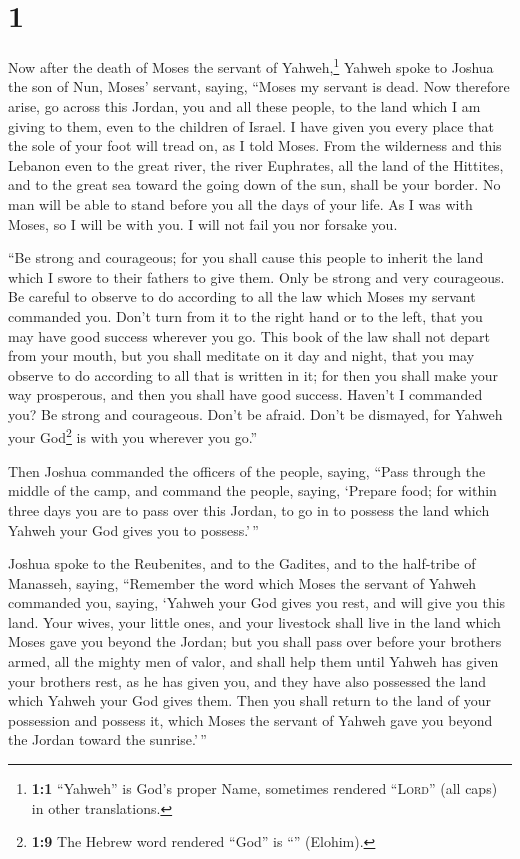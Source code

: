 \hypertarget{section}{%
\section{1}\label{section}}

 Now after the death of Moses the servant of
Yahweh,\footnote{\textbf{1:1} ``Yahweh'' is God's proper Name, sometimes
  rendered ``\textsc{Lord}'' (all caps) in other translations.} Yahweh
spoke to Joshua the son of Nun, Moses' servant, saying, 
``Moses my servant is dead. Now therefore arise, go across this Jordan,
you and all these people, to the land which I am giving to them, even to
the children of Israel.  I have given you every place that
the sole of your foot will tread on, as I told Moses. 
From the wilderness and this Lebanon even to the great river, the river
Euphrates, all the land of the Hittites, and to the great sea toward the
going down of the sun, shall be your border.  No man will
be able to stand before you all the days of your life. As I was with
Moses, so I will be with you. I will not fail you nor forsake you.

 ``Be strong and courageous; for you shall cause this
people to inherit the land which I swore to their fathers to give them.
 Only be strong and very courageous. Be careful to observe
to do according to all the law which Moses my servant commanded you.
Don't turn from it to the right hand or to the left, that you may have
good success wherever you go.  This book of the law shall
not depart from your mouth, but you shall meditate on it day and night,
that you may observe to do according to all that is written in it; for
then you shall make your way prosperous, and then you shall have good
success.  Haven't I commanded you? Be strong and
courageous. Don't be afraid. Don't be dismayed, for Yahweh your
God\footnote{\textbf{1:9} The Hebrew word rendered ``God'' is
  ``'' (Elohim).} is with you wherever you go.''

 Then Joshua commanded the officers of the people,
saying,  ``Pass through the middle of the camp, and
command the people, saying, `Prepare food; for within three days you are
to pass over this Jordan, to go in to possess the land which Yahweh your
God gives you to possess.'\,''

 Joshua spoke to the Reubenites, and to the Gadites, and
to the half-tribe of Manasseh, saying,  ``Remember the
word which Moses the servant of Yahweh commanded you, saying, `Yahweh
your God gives you rest, and will give you this land. 
Your wives, your little ones, and your livestock shall live in the land
which Moses gave you beyond the Jordan; but you shall pass over before
your brothers armed, all the mighty men of valor, and shall help them
 until Yahweh has given your brothers rest, as he has
given you, and they have also possessed the land which Yahweh your God
gives them. Then you shall return to the land of your possession and
possess it, which Moses the servant of Yahweh gave you beyond the Jordan
toward the sunrise.'\,''

